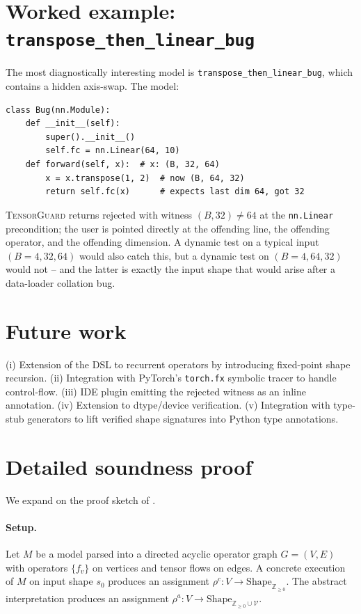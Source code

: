 \documentclass{article}
\theoremstyle{definition}
\begin{document}
\section{Worked example: \texttt{transpose\_then\_linear\_bug}}
\label{sec:worked-example}
The most diagnostically interesting model is
\verb|transpose_then_linear_bug|, which contains a hidden
axis-swap. The model:
\begin{lstlisting}
class Bug(nn.Module):
    def __init__(self):
        super().__init__()
        self.fc = nn.Linear(64, 10)
    def forward(self, x):  # x: (B, 32, 64)
        x = x.transpose(1, 2)  # now (B, 64, 32)
        return self.fc(x)      # expects last dim 64, got 32
\end{lstlisting}
\textsc{TensorGuard} returns \textsf{rejected} with witness
$(B, 32)\ne 64$ at the \verb|nn.Linear| precondition; the user is
pointed directly at the offending line, the offending operator,
and the offending dimension. A dynamic test on a typical input
$(B=4,32,64)$ would also catch this, but a dynamic test on
$(B=4,64,32)$ would not -- and the latter is exactly the input
shape that would arise after a data-loader collation bug.

\section{Future work}\label{sec:future}
(i) Extension of the DSL to recurrent operators by introducing
fixed-point shape recursion. (ii) Integration with PyTorch's
\verb|torch.fx| symbolic tracer to handle control-flow.
(iii) IDE plugin emitting the \textsf{rejected} witness as an
inline annotation. (iv) Extension to dtype/device verification.
(v) Integration with type-stub generators to lift verified shape
signatures into Python type annotations.

\section{Detailed soundness proof}\label{sec:soundness-proof}
We expand on the proof sketch of .

\paragraph{Setup.} Let $M$ be a model parsed into a directed
acyclic operator graph $G=(V,E)$ with operators $\{f_v\}$ on
vertices and tensor flows on edges. A concrete execution of $M$
on input shape $s_0$ produces an assignment
$\rho^c: V\to\mathrm{Shape}_{\mathbb Z_{\ge 0}}$. The abstract
interpretation produces an assignment
$\rho^a: V\to\mathrm{Shape}_{\mathbb Z_{\ge 0}\cup\mathcal V}$.
\end{document}
